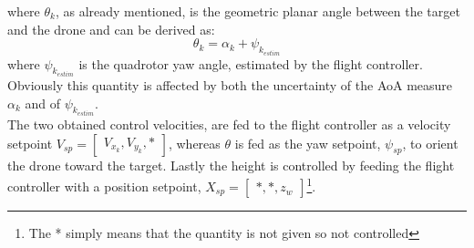 where $\theta_k$, as already mentioned, is the geometric planar angle between the target and the drone and can be derived as:
\begin{equation}\label{PF:yawsp}
    \theta_k = \alpha_k +\psi_{k_{estim}}
\end{equation}
where $\psi_{k_{estim}}$ is the quadrotor yaw angle, estimated by the flight controller. Obviously this quantity is affected by both the uncertainty of the AoA measure $\alpha_k$ and of $\psi_{k_{estim}}$.\\
The two obtained control velocities, are fed to the flight controller as a velocity setpoint $V_{sp} = \begin{bmatrix} V_{x_k}, V_{y_k}, * \end{bmatrix}$, whereas $\theta$ is fed as the yaw setpoint, $\psi_{sp}$, to orient the drone toward the target. Lastly the height is controlled by feeding the flight controller with a position setpoint, $X_{sp} = \begin{bmatrix} *, *, z_w \end{bmatrix}$\footnote{The * simply means that the quantity is not given so not controlled}.
